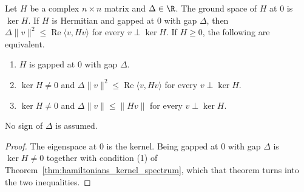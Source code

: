 \begin{theorem}
    \label{thm:hamiltonians_kernel_gap}
    \leanok
    Let $H$ be a complex $n\times n$ matrix and $\Delta\in\R$. The ground space
    of $H$ at $0$ is $\ker H$. If $H$ is Hermitian and gapped at $0$ with gap
    $\Delta$, then $\Delta\lVert v\rVert^2\le\operatorname{Re}\langle v,Hv\rangle$
    for every $v\perp\ker H$. If $H\ge0$, the following are equivalent.
    \begin{enumerate}
        \item $H$ is gapped at $0$ with gap $\Delta$.
        \item $\ker H\neq0$ and
              $\Delta\lVert v\rVert^2\le\operatorname{Re}\langle v,Hv\rangle$ for
              every $v\perp\ker H$.
        \item $\ker H\neq0$ and $\Delta\lVert v\rVert\le\lVert Hv\rVert$ for every
              $v\perp\ker H$.
    \end{enumerate}
    No sign of $\Delta$ is assumed.
\end{theorem}
\begin{proof}\leanok
    The eigenspace at $0$ is the kernel. Being gapped at $0$ with gap $\Delta$ is
    $\ker H\neq0$ together with condition (1) of
    Theorem~\ref{thm:hamiltonians_kernel_spectrum}, which that theorem turns into
    the two inequalities.
\end{proof}

